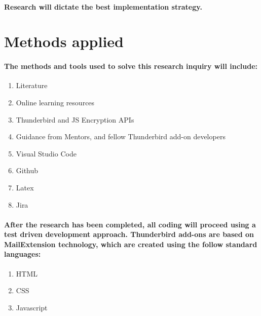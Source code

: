 \paragraph{Research will dictate the best implementation strategy.}

\section{Methods applied}




\paragraph{The methods and tools used to solve this research inquiry will include:}

\begin{enumerate}
\item Literature
\item Online learning resources
\item Thunderbird and JS Encryption APIs
\item Guidance from Mentors, and fellow Thunderbird add-on developers
\item Visual Studio Code
\item Github
\item Latex
\item Jira
\end{enumerate}

\paragraph{After the research has been completed, all coding will proceed using a test driven development approach. Thunderbird add-ons are based on MailExtension technology, which are created using the follow standard languages:}

\begin{enumerate}
\item HTML
\item CSS
\item Javascript
\end{enumerate}







